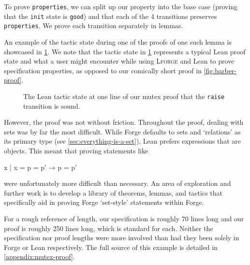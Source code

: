 To prove \texttt{properties}, we can split up our property into the base case (proving that the \texttt{init} state is \texttt{good}) and that each of the 4 transitions preserves \texttt{properties}. We prove each transition separately in lemmas. 

An example of the tactic state during one of the proofs of one such lemma is showcased in \cref{fig:mutex-proof}. We note that the tactic state in \cref{fig:mutex-proof} represents a typical Lean proof state and what a user might encounter while using \textsc{Lforge} and Lean to prove specification properties, as opposed to our comically short proof in \cref{fig:barber-proof}. 

\begin{figure}[!htb]
  \centering
  \caption{The Lean tactic state at one line of our mutex proof that the \texttt{raise} transition is sound. }
  \label{fig:mutex-proof}
\end{figure}

\newpage

However, the proof was not without friction. Throughout the proof, dealing with sets was by far the most difficult. While Forge defaults to sets and `relations' as its primary type (see \cref{sec:everything-is-a-set}), Lean prefers expressions that are objects. This meant that proving statements like 
\begin{lean*}
{ x | x = p } = { p' } → p = p'
\end{lean*}
were unfortunately more difficult than necessary. An area of exploration and further work is to develop a library of theorems, lemmas, and tactics that specifically aid in proving Forge `set-style' statements within Forge. 

For a rough reference of length, our specification is roughly 70 lines long and our proof is roughly 250 lines long, which is standard for each. Neither the specification nor proof lengths were more involved than had they been solely in Forge or Lean respectively. The full source of this example is detailed in \cref{appendix:mutex-proof}. 

